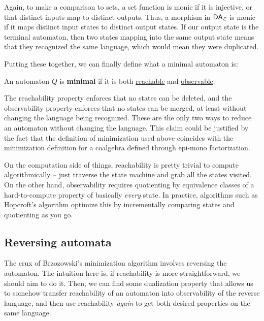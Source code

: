 Again, to make a comparison to sets, a set function is monic if it is injective, or that distinct inputs map to distinct outputs.
Thus, a morphism in $\mathsf{DA}_\mathcal L$ is monic if it maps distinct input states to distinct output states.
If our output state is the terminal automaton, then two states mapping into the same output state means that they recognized the same language, which would mean they were duplicated.

Putting these together, we can finally define what a minimal automaton is:

\begin{definition}
    \label{def:minimalAutomaton}
  An automaton $Q$ is \textbf{minimal} if it is both \hyperref[def:reachableAutomaton]{reachable} and \hyperref[def:observableAutomaton]{observable}.
\end{definition}

The reachability property enforces that no states can be deleted, and the observability property enforces that no states can be merged, at least without changing the language being recognized.
These are the only two ways to reduce an automaton without changing the language.
This claim could be justified by the fact that the definition of minimization used above coincides with the minimization definition for a coalgebra defined through epi-mono factorization\cite{bezhanishviliMinimizationDuality2012}.

On the computation side of things, reachability is pretty trivial to compute algorithmically -- just traverse the state machine and grab all the states visited.
On the other hand, observability requires quotienting by equivalence classes of a hard-to-compute property of basically \emph{every} state.
In practice, algorithms such as Hopcroft's algorithm optimize this by incrementally comparing states and quotienting as you go.

\subsection{Reversing automata}

The crux of Brzozowski's minimization algorithm involves reversing the automaton.
The intuition here is, if reachability is more straightforward, we should aim to do it.
Then, we can find some dualization property that allows us to somehow transfer reachability of an automaton into observability of the reverse language, and then use reachability \emph{again} to get both desired properties on the same language.

